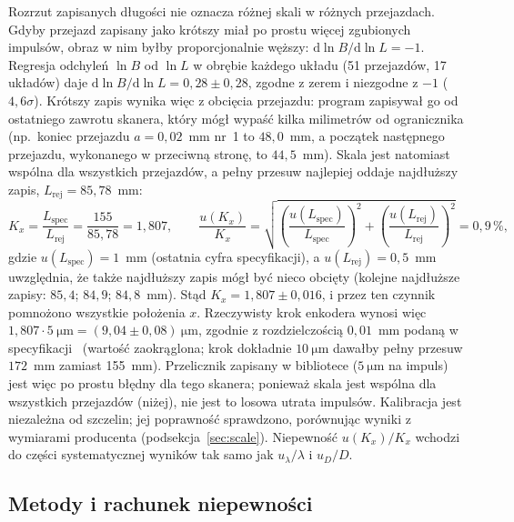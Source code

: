 \documentclass[12pt, a4paper]{article}
\begin{document}
Rozrzut zapisanych długości nie oznacza różnej skali w różnych przejazdach. Gdyby przejazd
zapisany jako krótszy miał po prostu więcej zgubionych impulsów, obraz w nim byłby proporcjonalnie
węższy: $\mathrm{d}\ln B/\mathrm{d}\ln L = -1$. Regresja odchyleń $\ln B$ od $\ln L$ w obrębie
każdego układu (51 przejazdów, 17 układów) daje $\mathrm{d}\ln B/\mathrm{d}\ln L = 0{,}28 \pm 0{,}28$,
zgodne z zerem i niezgodne z $-1$ ($4{,}6\sigma$). Krótszy zapis wynika więc z obcięcia
przejazdu: program zapisywał go od ostatniego zawrotu skanera, który mógł wypaść kilka
milimetrów od ogranicznika (np.\ koniec przejazdu $a = 0{,}02$~mm nr~1 to $48{,}0$~mm, a początek
następnego przejazdu, wykonanego w przeciwną stronę, to $44{,}5$~mm). Skala jest natomiast
wspólna dla wszystkich przejazdów, a pełny przesuw najlepiej oddaje najdłuższy zapis,
$L_\text{rej} = 85{,}78$~mm:
\begin{equation}
    K_x = \frac{L_\text{spec}}{L_\text{rej}} = \frac{155}{85{,}78} = 1{,}807, \qquad
    \frac{u(K_x)}{K_x} = \sqrt{\left(\frac{u(L_\text{spec})}{L_\text{spec}}\right)^2
                       + \left(\frac{u(L_\text{rej})}{L_\text{rej}}\right)^2} = 0{,}9\,\%,
    \label{eq:Kx}
\end{equation}
gdzie $u(L_\text{spec}) = 1$~mm (ostatnia cyfra specyfikacji), a $u(L_\text{rej}) = 0{,}5$~mm
uwzględnia, że także najdłuższy zapis mógł być nieco obcięty (kolejne najdłuższe zapisy:
$85{,}4$; $84{,}9$; $84{,}8$~mm). Stąd
$K_x = 1{,}807 \pm 0{,}016$, i przez ten czynnik pomnożono wszystkie położenia $x$. Rzeczywisty
krok enkodera wynosi więc $1{,}807 \cdot \SI{5}{\micro\meter} = (9{,}04 \pm 0{,}08)~\si{\micro\meter}$,
zgodnie z rozdzielczością $0{,}01$~mm podaną w specyfikacji~\cite{pasco} (wartość zaokrąglona;
krok dokładnie $\SI{10}{\micro\meter}$ dawałby pełny przesuw $172$~mm zamiast 155~mm).
Przelicznik zapisany w bibliotece ($\SI{5}{\micro\meter}$ na impuls) jest więc po prostu
błędny dla tego skanera; ponieważ skala jest wspólna dla wszystkich przejazdów (niżej), nie jest
to losowa utrata impulsów. Kalibracja
jest niezależna od szczelin; jej poprawność sprawdzono, porównując wyniki z wymiarami
producenta (podsekcja~\ref{sec:scale}). Niepewność $u(K_x)/K_x$ wchodzi do części
systematycznej wyników tak samo jak $u_\lambda/\lambda$ i $u_D/D$.

\subsection{Metody i rachunek niepewności}
\end{document}
